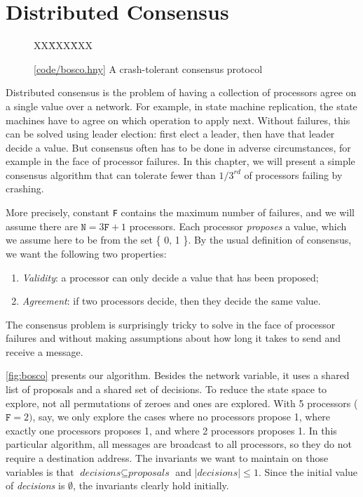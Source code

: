 \documentclass{report}
\newcommand{\harmonysource}[1]{
\begin{tabbing}
XX\=XXX\=XXX\kill
    
\end{tabbing}
}
\newcommand{\harmonylink}[1]{%
[\href{https://harmony.cs.cornell.edu/#1}{\underline{#1}}]%
}
\newenvironment{code}{
\tcolorbox
}{
\endtcolorbox
}
\begin{document}
\chapter{Distributed Consensus}
\label{ch:consensus}

\begin{figure}
\begin{code}
\harmonysource{bosco}
\end{code}
\caption{\harmonylink{code/bosco.hny} A crash-tolerant consensus protocol}
\label{fig:bosco}
\end{figure}

Distributed consensus is the problem of having a collection of processors agree
on a single value over a network.
For example, in state machine replication, the state machines have to agree
on which operation to apply next.
Without failures, this can be solved using leader election: first elect a leader, then have that leader decide a value.
But consensus often has to be done in adverse circumstances,
for example in the face of processor failures.
In this chapter, we will present a simple consensus algorithm that can tolerate
fewer than $1/3^{rd}$ of processors failing by crashing.

More precisely,
constant \texttt{F} contains the maximum number of failures, and
we will assume there are $\texttt{N} = 3\texttt{F} + 1$ processors.
Each processor \emph{proposes} a value, which we assume here to be from the
set \{ 0, 1 \}.
By the usual definition of consensus, we want the following two properties:
\begin{enumerate}
\item \emph{Validity}: a processor can only decide a value that has been proposed;
\item \emph{Agreement}: if two processors decide, then they decide the same value.
\end{enumerate}
The consensus problem is surprisingly tricky to solve in the face of processor
failures and without making assumptions about how long it takes to send
and receive a message.

\autoref{fig:bosco} presents our algorithm.  Besides the network variable, it uses a
shared list of proposals and a shared set of decisions.
To reduce the state space to explore, not all permutations of zeroes and ones are
explored.  With 5 processors ($\mathtt{F} = 2)$, say, we only explore the cases where
no processors propose 1, where exactly one processors proposes 1, and where 2 processors
proposes 1.
In this particular algorithm, all messages are broadcast to all processors, so they do
not require a destination address.
The invariants we want to maintain
on those variables is that $\textit{decisions} \subseteq \textit{proposals}$
and $|\textit{decisions}| \leq 1$.  Since the initial value of \textit{decisions} is
$\emptyset$, the invariants clearly hold initially.
\end{document}
